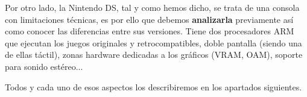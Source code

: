 Por otro lado, la Nintendo DS, tal y como hemos dicho, se trata de una consola con limitaciones técnicas, es por ello que debemos \textbf{analizarla} previamente así como conocer las diferencias entre sus versiones. Tiene dos procesadores ARM que ejecutan los juegos originales y retrocompatibles, doble pantalla (siendo una de ellas táctil), zonas hardware dedicadas a los gráficos (VRAM, OAM), soporte para sonido estéreo...

\vspace{0.5cm}

Todos y cada uno de esos aspectos los describiremos en los apartados siguientes.
























